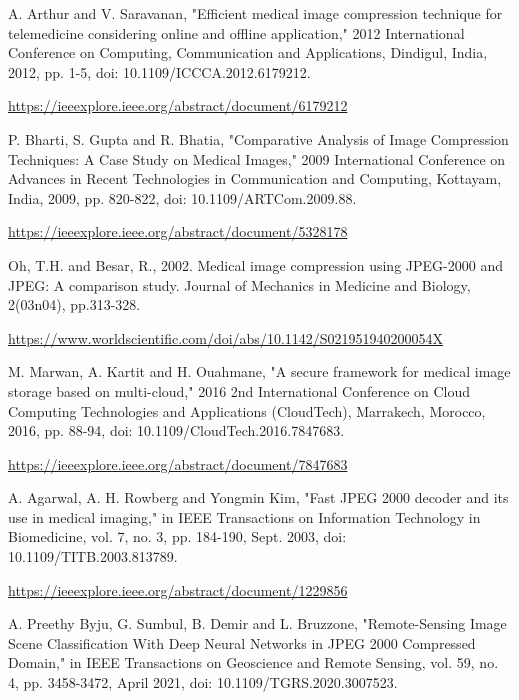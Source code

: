 \documentclass[conference,letterpaper]{IEEEtran}
\begin{document}
\begin{thebibliography}{00}

A. Arthur and V. Saravanan, "Efficient medical image compression technique for telemedicine considering online and offline application," 2012 International Conference on Computing, Communication and Applications, Dindigul, India, 2012, pp. 1-5, doi: 10.1109/ICCCA.2012.6179212.

\href{https://ieeexplore.ieee.org/abstract/document/6179212}{https://ieeexplore.ieee.org/abstract/document/6179212}

P. Bharti, S. Gupta and R. Bhatia, "Comparative Analysis of Image Compression Techniques: A Case Study on Medical Images," 2009 International Conference on Advances in Recent Technologies in Communication and Computing, Kottayam, India, 2009, pp. 820-822, doi: 10.1109/ARTCom.2009.88.

\href{https://ieeexplore.ieee.org/abstract/document/5328178}{https://ieeexplore.ieee.org/abstract/document/5328178}

Oh, T.H. and Besar, R., 2002. Medical image compression using JPEG-2000 and JPEG: A comparison study. Journal of Mechanics in Medicine and Biology, 2(03n04), pp.313-328.

\href{https://www.worldscientific.com/doi/abs/10.1142/S021951940200054X}{https://www.worldscientific.com/doi/abs/10.1142/S021951940200054X}

M. Marwan, A. Kartit and H. Ouahmane, "A secure framework for medical image storage based on multi-cloud," 2016 2nd International Conference on Cloud Computing Technologies and Applications (CloudTech), Marrakech, Morocco, 2016, pp. 88-94, doi: 10.1109/CloudTech.2016.7847683.

\href{https://ieeexplore.ieee.org/abstract/document/7847683}{https://ieeexplore.ieee.org/abstract/document/7847683}

A. Agarwal, A. H. Rowberg and Yongmin Kim, "Fast JPEG 2000 decoder and its use in medical imaging," in IEEE Transactions on Information Technology in Biomedicine, vol. 7, no. 3, pp. 184-190, Sept. 2003, doi: 10.1109/TITB.2003.813789.

\href{https://ieeexplore.ieee.org/abstract/document/1229856}{https://ieeexplore.ieee.org/abstract/document/1229856}

A. Preethy Byju, G. Sumbul, B. Demir and L. Bruzzone, "Remote-Sensing Image Scene Classification With Deep Neural Networks in JPEG 2000 Compressed Domain," in IEEE Transactions on Geoscience and Remote Sensing, vol. 59, no. 4, pp. 3458-3472, April 2021, doi: 10.1109/TGRS.2020.3007523.


\end{thebibliography}
\end{document}
